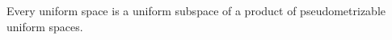 \begin{corollary}\label{corollary:uniform_space_is_subspace_of_product_of_pseudometrizable_spaces}
Every uniform space is a uniform subspace of a product of pseudometrizable uniform spaces.
\end{corollary}

































